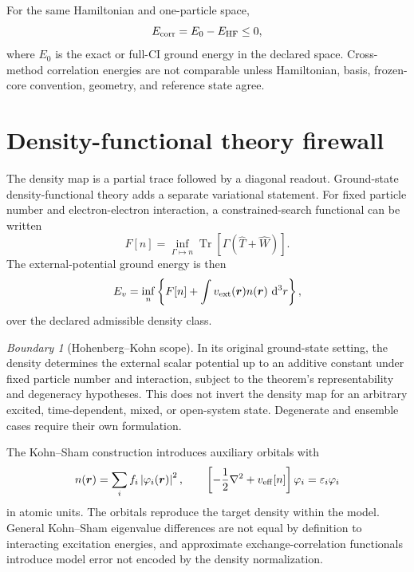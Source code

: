 \documentclass[11pt,a4paper]{article}
\theoremstyle{definition}
\theoremstyle{plain}
\theoremstyle{remark}
\newtheorem{warning}[definition]{Boundary}
\newcommand{\dd}{\mathop{}\!\mathrm d}
\newcommand{\abs}[1]{\left\lvert #1\right\rvert}
\newcommand{\Tr}{\operatorname{Tr}}
\begin{document}
For the same Hamiltonian and one-particle space,
\begin{equation}\label{eq:correlation-energy}
E_{\rm corr}=E_0-E_{\rm HF}\le0,
\end{equation}
where \(E_0\) is the exact or full-CI ground energy in the declared
space.  Cross-method correlation energies are not comparable unless
Hamiltonian, basis, frozen-core convention, geometry, and reference
state agree.

\section{Density-functional theory firewall}

The density map is a partial trace followed by a diagonal readout.
Ground-state density-functional theory adds a separate variational
statement.  For fixed particle number and electron-electron
interaction, a constrained-search functional can be written
\begin{equation}\label{eq:levy-search}
F[n]=\inf_{\Gamma\mapsto n}
\Tr\!\left[\Gamma(\widehat T+\widehat W)\right].
\end{equation}
The external-potential ground energy is then
\begin{equation}\label{eq:dft-variational}
E_v=\inf_n\left\{
F[n]+\int v_{\rm ext}(\bm r)n(\bm r)\,\dd^3r
\right\},
\end{equation}
over the declared admissible density class.

\begin{warning}[Hohenberg--Kohn scope]
In its original ground-state setting, the density determines the
external scalar potential up to an additive constant under fixed
particle number and interaction, subject to the theorem's
representability and degeneracy hypotheses.  This does not invert the
density map for an arbitrary excited, time-dependent, mixed, or
open-system state.  Degenerate and ensemble cases require their own
formulation.
\end{warning}

The Kohn--Sham construction introduces auxiliary orbitals with
\begin{equation}\label{eq:ks-density}
n(\bm r)=\sum_i f_i\abs{\varphi_i(\bm r)}^2,
\qquad
\left[-\frac12\nabla^2+v_{\rm eff}[n]\right]\varphi_i
=\varepsilon_i\varphi_i
\end{equation}
in atomic units.  The orbitals reproduce the target density within
the model.  General Kohn--Sham eigenvalue differences are not equal
by definition to interacting excitation energies, and approximate
exchange-correlation functionals introduce model error not encoded
by the density normalization.
\end{document}
